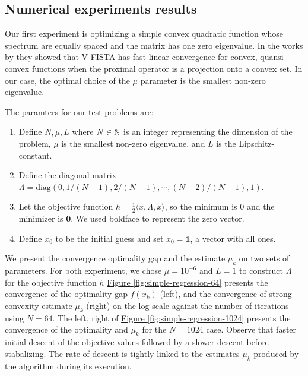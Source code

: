 \documentclass[12pt]{article}
\begin{document}
    \subsection{Numerical experiments results}\label{sec:results-numerical-experiment}
        Our first experiment is optimizing a simple convex quadratic function whose spectrum are equally spaced and the matrix has one zero eigenvalue. 
        In the works by \cite{necoara_linear_2019} they showed that V-FISTA has fast linear convergence for convex, quansi-convex functions when the proximal operator is a projection onto a convex set. 
        In our case, the optimal choice of the $\mu$ parameter is the smallest non-zero eigenvalue. 
        \par
        The paramters for our test problems are: 
        \begin{enumerate}
            \item  Define $N, \mu, L$ where $N \in \mathbb N$ is an integer representing the dimension of the problem, $\mu$ is the smallest non-zero eigenvalue, and $L$ is the Lipschitz-constant. 
            \item  Define the diagonal matrix $\Lambda = \text{diag}(0, 1/(N - 1), 2/(N - 1), \cdots, (N-2)/(N - 1),1)$. 
            \item  Let the objective function $h = \frac{1}{2}\langle x, \Lambda, x\rangle$, so the minimum is $0$ and the minimizer is $\mathbf 0$. We used boldface to represent the zero vector. 
            \item  Define $x_0$ to be the initial guess and set $x_0 = \mathbf 1$, a vector with all ones. 
        \end{enumerate}
        We present the convergence optimality gap and the estimate $\mu_k$ on two sets of parameters. 
        For both experiment, we chose $\mu=10^{-6}$ and $L = 1$ to construct $\Lambda$ for the objective function $h$
        \hyperref[fig:simple-regression-64]{Figure \ref*{fig:simple-regression-64}} presents the convergence of the optimality gap $f(x_k)$ (left), and the convergence of strong convexity estimate $\mu_k$ (right) on the log scale against the number of iterations using $N = 64$. 
        The left, right of \hyperref[fig:simple-regression-1024]{Figure \ref*{fig:simple-regression-1024}} presents the convergence of the optimality and $\mu_k$ for the $N=1024$ case. 
        Observe that faster initial descent of the objective values followed by a slower descent before stabalizing. 
        The rate of descent is tightly linked to the estimates $\mu_k$ produced by the algorithm during its execution. 
\end{document}
